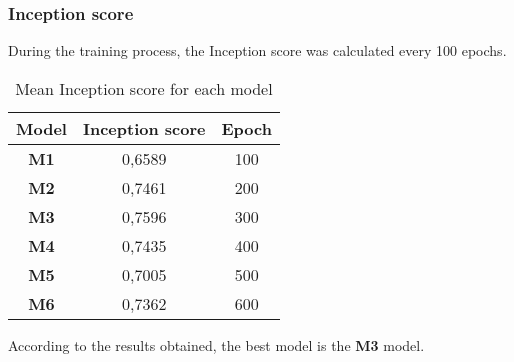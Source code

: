 \subsubsection{Inception score}
During the training process, the Inception score was calculated every 100 epochs.
\begin{table}[H]
    \centering
    \begin{tabular}{|c|c|c|}
        \hline
        \textbf{Model} & \textbf{Inception score} & \textbf{Epoch} \\
        \hline
        \hline
        \textbf{M1} & 0,6589 & 100 \\
        \hline
        \textbf{M2} & 0,7461 & 200 \\
        \hline
        \textbf{M3} & 0,7596 & 300 \\
        \hline
        \textbf{M4} & 0,7435 & 400 \\
        \hline
        \textbf{M5} & 0,7005 & 500 \\
        \hline
        \textbf{M6} & 0,7362 & 600 \\
    \end{tabular}
    \caption{Mean Inception score for each model}\label{tab:inception-score}
\end{table}
According to the results obtained, the best model is the \textbf{M3} model.

